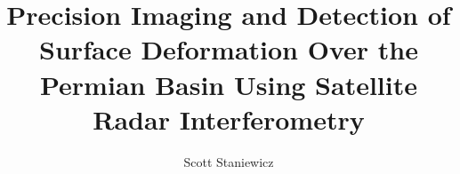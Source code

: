 \documentclass{utexasthesis}
\title{Precision Imaging and Detection of Surface Deformation Over the Permian Basin Using Satellite Radar Interferometry }
\author{Scott Staniewicz}
\begin{document}
\maketitle

\begin{dedication}


\end{dedication}


\begin{acknowledgments}

\end{acknowledgments}

\begin{abstract}
\end{abstract}

\maketableofcontents















\pagebreak



\appendix




%

% 


\makeappendix

 
% 

\end{document}
